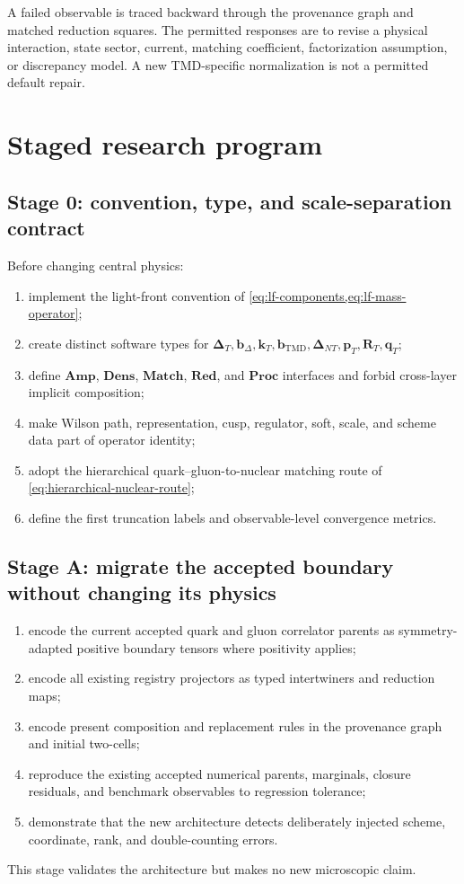 \documentclass[11pt]{article}
\newcommand{\kT}{\bm{k}_{T}}
\newcommand{\pT}{\bm{p}_{T}}
\newcommand{\qT}{\bm{q}_{T}}
\newcommand{\DT}{\bm{\Delta}_{T}}
\newcommand{\DNT}{\bm{\Delta}_{N T}}
\newcommand{\bD}{\bm{b}_{\Delta}}
\newcommand{\bM}{\bm{b}_{\mathrm{TMD}}}
\newcommand{\RT}{\bm{R}_{T}}
\newcommand{\Amp}{\mathbf{Amp}}
\newcommand{\Dens}{\mathbf{Dens}}
\newcommand{\Match}{\mathbf{Match}}
\newcommand{\Red}{\mathbf{Red}}
\newcommand{\Proc}{\mathbf{Proc}}
\begin{document}
A failed observable is traced backward through the provenance graph and
matched reduction squares.  The permitted responses are to revise a physical
interaction, state sector, current, matching coefficient, factorization
assumption, or discrepancy model.  A new TMD-specific normalization is not a
permitted default repair.

\section{Staged research program}
\label{sec:stages}

\subsection{Stage 0: convention, type, and scale-separation contract}

Before changing central physics:
\begin{enumerate}
\item implement the light-front convention of
\cref{eq:lf-components,eq:lf-mass-operator};
\item create distinct software types for \(\DT,\bD,\kT,\bM,\DNT,\pT,\RT,\qT\);
\item define \(\Amp\), \(\Dens\), \(\Match\), \(\Red\), and \(\Proc\)
interfaces and forbid cross-layer implicit composition;
\item make Wilson path, representation, cusp, regulator, soft, scale, and
scheme data part of operator identity;
\item adopt the hierarchical quark--gluon-to-nuclear matching route of
\cref{eq:hierarchical-nuclear-route};
\item define the first truncation labels and observable-level convergence
metrics.
\end{enumerate}

\subsection{Stage A: migrate the accepted boundary without changing its physics}

\begin{enumerate}
\item encode the current accepted quark and gluon correlator parents as
symmetry-adapted positive boundary tensors where positivity applies;
\item encode all existing registry projectors as typed intertwiners and
reduction maps;
\item encode present composition and replacement rules in the provenance
graph and initial two-cells;
\item reproduce the existing accepted numerical parents, marginals, closure
residuals, and benchmark observables to regression tolerance;
\item demonstrate that the new architecture detects deliberately injected
scheme, coordinate, rank, and double-counting errors.
\end{enumerate}
This stage validates the architecture but makes no new microscopic claim.
\end{document}
